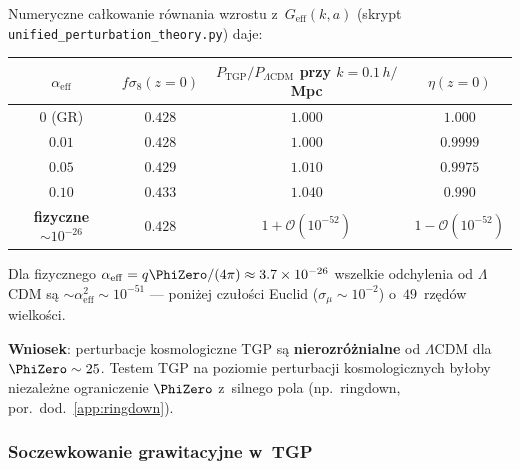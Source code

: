 \begin{remark}%
\label{rem:transfer-results}
Numeryczne ca\l{}kowanie r\'ownania wzrostu z~$G_{\mathrm{eff}}(k,a)$
(skrypt \texttt{unified\_perturbation\_theory.py}) daje:
\begin{center}
\begin{tabular}{cccc}
\toprule
$\alpha_{\mathrm{eff}}$ & $f\sigma_8(z{=}0)$ &
$P_{\mathrm{TGP}}/P_{\Lambda\mathrm{CDM}}$ przy $k{=}0.1\,h/$Mpc &
$\eta(z{=}0)$ \\
\midrule
$0$ (GR)    & $0.428$ & $1.000$ & $1.000$ \\
$0.01$      & $0.428$ & $1.000$ & $0.9999$ \\
$0.05$      & $0.429$ & $1.010$ & $0.9975$ \\
$0.10$      & $0.433$ & $1.040$ & $0.990$ \\
\midrule
\textbf{fizyczne} $\sim10^{-26}$ & $0.428$ & $1 + \mathcal{O}(10^{-52})$
  & $1 - \mathcal{O}(10^{-52})$ \\
\bottomrule
\end{tabular}
\end{center}

Dla fizycznego $\alpha_{\mathrm{eff}} = q\PhiZero/(4\pi)
\approx 3.7\times 10^{-26}$ wszelkie odchylenia od $\Lambda$CDM
s\k{a} $\sim\alpha_{\mathrm{eff}}^2 \sim 10^{-51}$
--- poni\.zej czu\l{}o\'sci Euclid ($\sigma_\mu \sim 10^{-2}$)
o~$49$~rz\k{e}d\'ow wielko\'sci.

\textbf{Wniosek}: perturbacje kosmologiczne TGP s\k{a}
\textbf{nierozr\'o\.znialne} od $\Lambda$CDM dla $\PhiZero \sim 25$.
Testem TGP na poziomie perturbacji kosmologicznych by\l{}oby
niezale\.zne ograniczenie $\PhiZero$ z~silnego pola
(np.~ringdown, por.~dod.~\ref{app:ringdown}).
\end{remark}



\subsubsection{Soczewkowanie grawitacyjne w~TGP}\label{sssec:lensing}

